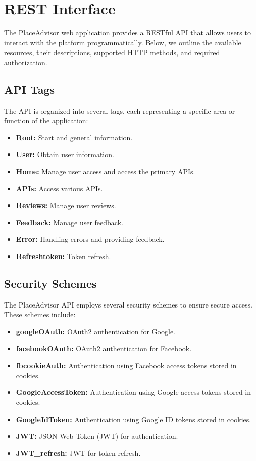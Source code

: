 \documentclass[../main.tex]{subfiles}
\begin{document}
\section{REST Interface}\label{sec:rest}
The PlaceAdvisor web application provides a RESTful API that allows users to interact with the platform programmatically. Below, we outline the available resources, their descriptions, supported HTTP methods, and required authorization.

\subsection{API Tags}

The API is organized into several tags, each representing a specific area or function of the application:

\begin{itemize}
  \item \textbf{Root:} Start and general information.
  \item \textbf{User:} Obtain user information.
  \item \textbf{Home:} Manage user access and access the primary APIs.
  \item \textbf{APIs:} Access various APIs.
  \item \textbf{Reviews:} Manage user reviews.
  \item \textbf{Feedback:} Manage user feedback.
  \item \textbf{Error:} Handling errors and providing feedback.
  \item \textbf{Refreshtoken:} Token refresh.
\end{itemize}

\subsection{Security Schemes}

The PlaceAdvisor API employs several security schemes to ensure secure access. These schemes include:

\begin{itemize}
  \item \textbf{googleOAuth:} OAuth2 authentication for Google.
  \item \textbf{facebookOAuth:} OAuth2 authentication for Facebook.
  \item \textbf{fbcookieAuth:} Authentication using Facebook access tokens stored in cookies.
  \item \textbf{GoogleAccessToken:} Authentication using Google access tokens stored in cookies.
  \item \textbf{GoogleIdToken:} Authentication using Google ID tokens stored in cookies.
  \item \textbf{JWT:} JSON Web Token (JWT) for authentication.
  \item \textbf{JWT\_refresh:} JWT for token refresh.
\end{itemize}
\end{document}
